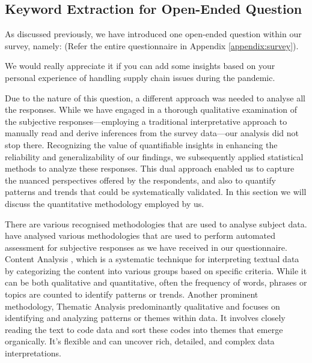 \subsection{Keyword Extraction for Open-Ended Question}

As discussed previously, we have introduced one open-ended question within our survey, namely: (Refer the entire questionnaire in Appendix \ref{appendix:survey}).

\begin{tcolorbox}[colback=blue!5!white, colframe=blue!15!black, boxrule=0.5mm, title=Subjective Question, fonttitle=\bfseries]
  We would really appreciate it if you can add some insights based on your personal experience of handling supply chain issues during the pandemic.
\end{tcolorbox}

Due to the nature of this question, a different approach was needed to analyse all the responses. While we have engaged in a thorough qualitative examination of the subjective responses—employing a traditional interpretative approach to manually read and derive inferences from the survey data—our analysis did not stop there. Recognizing the value of quantifiable insights in enhancing the reliability and generalizability of our findings, we subsequently applied statistical methods to analyze these responses. This dual approach enabled us to capture the nuanced perspectives offered by the respondents, and also to quantify patterns and trends that could be systematically validated. In this section we will discuss the quantitative methodology employed by us. 

There are various recognised methodologies that are used to analyse subject data. \textcite{Joshi2024AAnswers} have analysed various methodologies that are used to perform automated assessment for subjective responses as we have received in our questionnaire. Content Analysis \parencite{Harwood2003AnAnalysis}, which is a systematic technique for interpreting textual data by categorizing the content into various groups based on specific criteria. While it can be both qualitative and quantitative, often the frequency of words, phrases or topics are counted to identify patterns or trends. Another prominent methodology, Thematic Analysis \parencite{terry2017thematic} predominantly qualitative and focuses on identifying and analyzing patterns or themes within data. It involves closely reading the text to code data and sort these codes into themes that emerge organically. It's flexible and can uncover rich, detailed, and complex data interpretations. 

